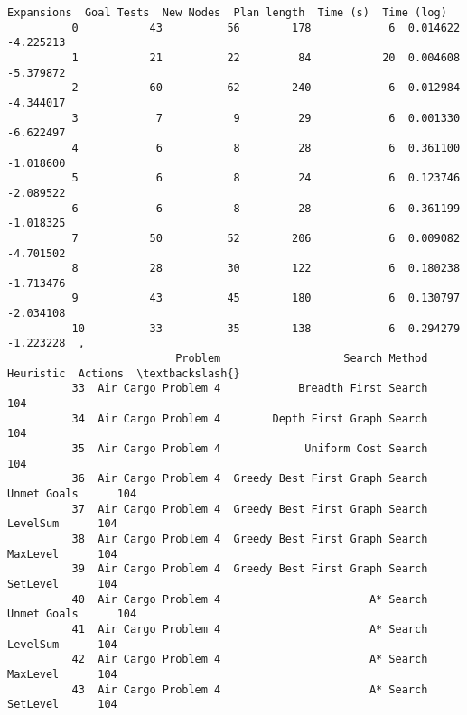 \documentclass[11pt]{article}
\begin{document}
\begin{Verbatim}[commandchars=\\\{\}]
              Expansions  Goal Tests  New Nodes  Plan length  Time (s)  Time (log)  
          0           43          56        178            6  0.014622   -4.225213  
          1           21          22         84           20  0.004608   -5.379872  
          2           60          62        240            6  0.012984   -4.344017  
          3            7           9         29            6  0.001330   -6.622497  
          4            6           8         28            6  0.361100   -1.018600  
          5            6           8         24            6  0.123746   -2.089522  
          6            6           8         28            6  0.361199   -1.018325  
          7           50          52        206            6  0.009082   -4.701502  
          8           28          30        122            6  0.180238   -1.713476  
          9           43          45        180            6  0.130797   -2.034108  
          10          33          35        138            6  0.294279   -1.223228  ,
                          Problem                   Search Method    Heuristic  Actions  \textbackslash{}
          33  Air Cargo Problem 4            Breadth First Search                   104   
          34  Air Cargo Problem 4        Depth First Graph Search                   104   
          35  Air Cargo Problem 4             Uniform Cost Search                   104   
          36  Air Cargo Problem 4  Greedy Best First Graph Search  Unmet Goals      104   
          37  Air Cargo Problem 4  Greedy Best First Graph Search     LevelSum      104   
          38  Air Cargo Problem 4  Greedy Best First Graph Search     MaxLevel      104   
          39  Air Cargo Problem 4  Greedy Best First Graph Search     SetLevel      104   
          40  Air Cargo Problem 4                       A* Search  Unmet Goals      104   
          41  Air Cargo Problem 4                       A* Search     LevelSum      104   
          42  Air Cargo Problem 4                       A* Search     MaxLevel      104   
          43  Air Cargo Problem 4                       A* Search     SetLevel      104   
          

\end{Verbatim}
\end{document}
